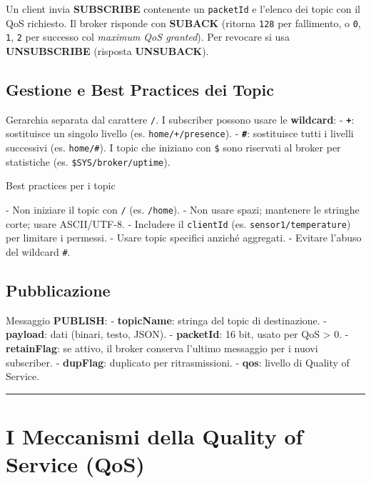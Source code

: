 \documentclass[
  italian,
  openany]{book}
\begin{document}
Un client invia \textbf{SUBSCRIBE} contenente un \texttt{packetId} e
l'elenco dei topic con il QoS richiesto. Il broker risponde con
\textbf{SUBACK} (ritorna \texttt{128} per fallimento, o \texttt{0},
\texttt{1}, \texttt{2} per successo col \emph{maximum QoS granted}). Per
revocare si usa \textbf{UNSUBSCRIBE} (risposta \textbf{UNSUBACK}).

\subsection{Gestione e Best Practices dei
Topic}\label{gestione-e-best-practices-dei-topic}

Gerarchia separata dal carattere \texttt{/}. I subscriber possono usare
le \textbf{wildcard}: - \textbf{\texttt{+}}: sostituisce un singolo
livello (es. \texttt{home/+/presence}). - \textbf{\texttt{\#}}:
sostituisce tutti i livelli successivi (es. \texttt{home/\#}). I topic
che iniziano con \texttt{\$} sono riservati al broker per statistiche
(es. \texttt{\$SYS/broker/uptime}).

\begin{calloutwarning}{Best practices per i topic}

- Non iniziare il topic con \texttt{/} (es. \texttt{/home}). - Non usare
spazi; mantenere le stringhe corte; usare ASCII/UTF-8. - Includere il
\texttt{clientId} (es. \texttt{sensor1/temperature}) per limitare i
permessi. - Usare topic specifici anziché aggregati. - Evitare l'abuso
del wildcard \texttt{\#}.

\end{calloutwarning}

\subsection{Pubblicazione}\label{pubblicazione}

Messaggio \textbf{PUBLISH}: - \textbf{topicName}: stringa del topic di
destinazione. - \textbf{payload}: dati (binari, testo, JSON). -
\textbf{packetId}: 16 bit, usato per QoS \textgreater{} 0. -
\textbf{retainFlag}: se attivo, il broker conserva l'ultimo messaggio
per i nuovi subscriber. - \textbf{dupFlag}: duplicato per
ritrasmissioni. - \textbf{qos}: livello di Quality of Service.

\begin{center}\rule{0.5\linewidth}{0.5pt}\end{center}

\section{I Meccanismi della Quality of Service
(QoS)}\label{i-meccanismi-della-quality-of-service-qos}
\end{document}
